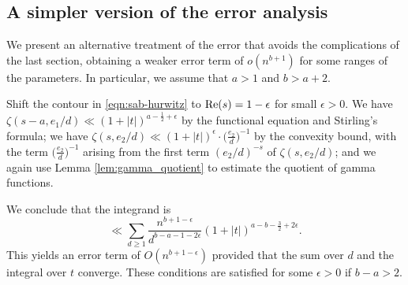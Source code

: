 \documentclass[12pt]{amsart}
\numberwithin{equation}{section}
\numberwithin{theorem}{section}
\renewcommand\Re{\textnormal{Re}}
\begin{document}
\subsection{A simpler version of the error analysis}\label{sec:easy}
We present an alternative treatment of the error that avoids the complications
of the last section, obtaining a weaker error term of 
$o(n^{b + 1})$ for some ranges of the parameters. In particular, we assume that $a > 1$ and $b>a+2$.

Shift the contour in \eqref{eqn:sab-hurwitz} to 
$\Re(s) = 1 - \epsilon$ for small $\epsilon > 0$. We have $\zeta(s - a, e_1/d) \ll (1 + |t|)^{a - \frac{1}{2} + \epsilon}$
by the functional equation and Stirling's formula; we have 
$\zeta(s, e_2/d) \ll (1 + |t|)^{\epsilon} \cdot \big( \frac{e_2}{d} \big)^{-1}$ by the convexity bound, with the
term $\big( \frac{e_2}{d} \big)^{-1}$ arising from the first term $(e_2/d)^{-s}$ of 
 $\zeta(s, e_2/d)$; and 
we again use Lemma \ref{lem:gamma_quotient} to estimate the quotient of gamma functions. 

We conclude that the integrand is
\[
	\ll \sum_{d \geq 1} \frac{n^{b+1-\epsilon}}{d^{b-a-1-2\epsilon}} (1+|t|)^{a-b-\frac{3}{2}+2\epsilon}.
\]
This yields an error term of $O(n^{b + 1 - \epsilon})$ provided that the sum over $d$ and the integral over $t$ converge.  These conditions are satisfied for some $\epsilon>0$ if $b - a > 2$.



\end{document}
